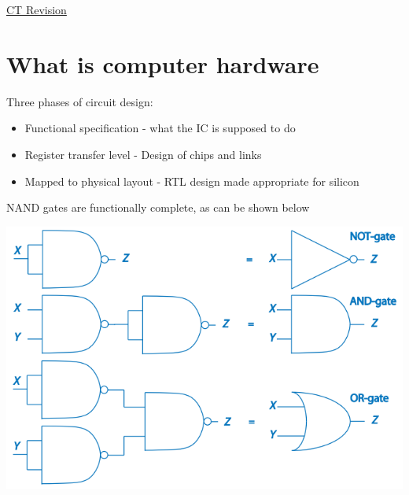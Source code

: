 \documentclass{article}[18pt]
\begin{document}
\begin{center}
\underline{\huge CT Revision}
\end{center}
\section{What is computer hardware}
Three phases of circuit design:
\begin{itemize}
	\item Functional specification - what the IC is supposed to do
	\item Register transfer level - Design of chips and links
	\item Mapped to physical layout - RTL design made appropriate for silicon
\end{itemize}
NAND gates are functionally complete, as can be shown below
\begin{center}
	\includegraphics[scale=0.5]{"NAND"}
\end{center}
\end{document}
